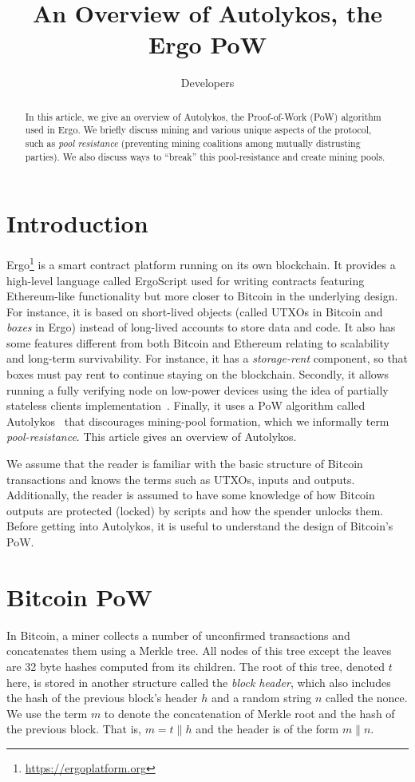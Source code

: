 \documentclass[runningheads]{llncs}
\newcommand{\langname}{ErgoScript\xspace}
\newcommand{\powname}{Autolykos\xspace}
\begin{document}
\title{An Overview of \powname, the Ergo PoW}
\author{Developers}
\maketitle

\begin{abstract}
	In this article, we give an overview of \powname, the Proof-of-Work (PoW) algorithm used in Ergo. We briefly discuss mining and various unique aspects of the protocol, such as {\em pool resistance} (preventing mining coalitions among mutually distrusting parties). We also discuss ways to ``break'' this pool-resistance and create mining pools. 
	 
\end{abstract}

\section{Introduction}

Ergo\footnote{\url{https://ergoplatform.org}} is a smart contract platform running on its own blockchain. It provides a high-level language called \langname used for writing contracts featuring Ethereum-like functionality but more closer to Bitcoin in the underlying design. For instance, it is based on short-lived objects (called UTXOs in Bitcoin and {\em boxes} in Ergo) instead of long-lived accounts to store data and code. It also has some features different from both Bitcoin and Ethereum relating to scalability and long-term survivability. For instance, it has a {\em storage-rent} component, so that boxes must pay rent to continue staying on the blockchain. Secondly, it allows running a fully verifying node on low-power devices using the idea of partially stateless clients implementation~\cite{RMCI17,ourPaperFull}. Finally, it uses a PoW algorithm called \powname~\cite{autolykos} that discourages mining-pool formation, which we informally term {\em pool-resistance}. This article gives an overview of \powname. 

We assume that the reader is familiar with the basic structure of Bitcoin transactions and knows the terms such as UTXOs, inputs and outputs. Additionally, the reader is assumed to have some knowledge of how Bitcoin outputs are protected (locked) by scripts and how the spender unlocks them. 
Before getting into \powname, it is useful to understand the design of Bitcoin's PoW. 


\section{Bitcoin PoW}
In Bitcoin, a miner collects a number of unconfirmed transactions and concatenates them using a Merkle tree. All nodes of this tree except the leaves are 32 byte hashes computed from its children. The root of this tree, denoted $t$ here, is stored in another structure called the {\em block header}, which also includes the hash of the previous block's header $h$ and a random string $n$ called the nonce. We use the term $m$ to denote the concatenation of Merkle root and the hash of the previous block. 
That is, $m = t\|h$ and the header is of the form $m\|n$. 
\end{document}

